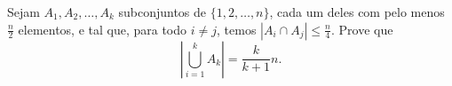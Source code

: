 Sejam $A_1, A_2, \dots, A_k$ subconjuntos de $\{1, 2, \dots, n\}$, cada um deles com pelo menos $\frac{n}{2}$ elementos, e tal que, para todo $i \neq j$, temos $|A_i \cap A_j| \le \frac{n}{4}$. Prove que \[\left| \bigcup_{i=1}^k A_k \right| = \frac{k}{k+1}n.\]
